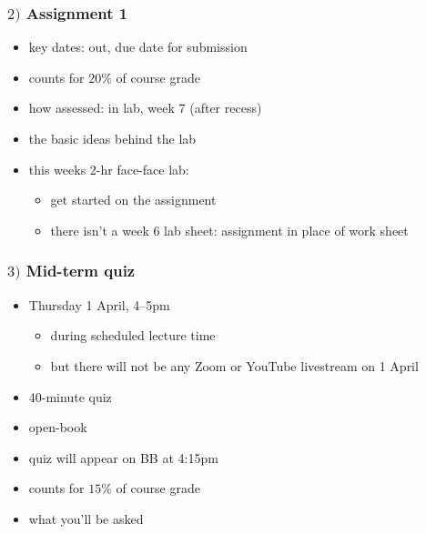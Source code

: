 \documentclass[english,14pt]{beamer}
\begin{document}

\begin{frame}[fragile]

\frametitle{$2)$ Assignment 1}

\begin{itemize}
	\item key dates: out, due date for submission
	\item counts for $20$\% of course grade
	\item how assessed: in lab, week 7 (after recess)
	\item the basic ideas behind the lab
	\item this weeks 2-hr face-face lab:
	\begin{itemize}
		\item get started on the assignment
		\item there isn't a week 6 lab sheet: assignment in place of work sheet
	\end{itemize}
\end{itemize}

\end{frame}


\begin{frame}[fragile]

\frametitle{$3)$ Mid-term quiz}

\begin{itemize}
	\item Thursday 1 April, 4--5pm
	\begin{itemize}
		\item during scheduled lecture time
		\item but there will not be any Zoom or YouTube livestream on 1 April
	\end{itemize}
	\item 40-minute quiz
	\item open-book

	\item quiz will appear on BB at 4:15pm
	\item counts for $15$\% of course grade
	\item what you'll be asked
\end{itemize}

\end{frame}

\end{document}
